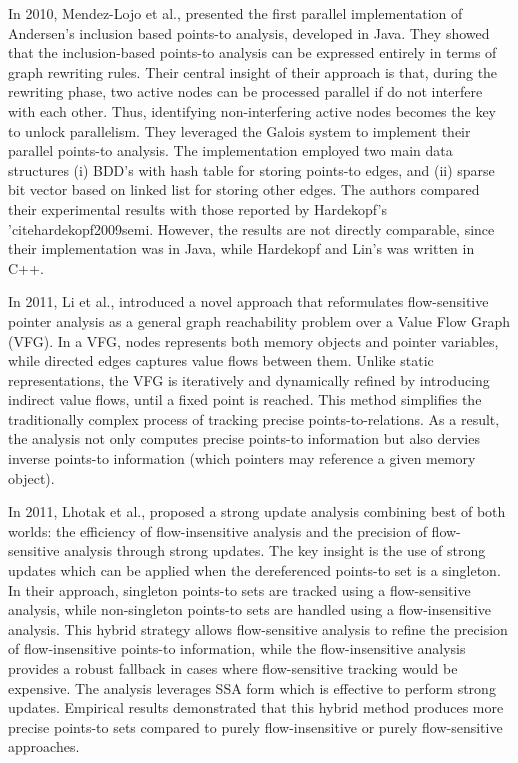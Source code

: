 In 2010, Mendez-Lojo et al., \cite{mendez2010parallel} presented the first parallel implementation of Andersen's inclusion based points-to analysis, developed in Java. 
They showed that the inclusion-based points-to analysis can be expressed entirely in terms of graph rewriting rules.
Their central insight of their approach is that, during the rewriting phase, two active nodes can be processed parallel if do not interfere with each other.
Thus, identifying non-interfering active nodes becomes the key to unlock parallelism.
They leveraged the Galois system \cite{galois} to implement their parallel points-to analysis.
The implementation employed two main data structures (i) BDD's with hash table for storing points-to edges, and (ii) sparse bit vector based on linked list for storing other edges. 
The authors compared their experimental results with those reported by Hardekopf's 'cite{hardekopf2009semi}.
However, the results are not directly comparable, since their implementation was in Java, while Hardekopf and Lin’s was written in C++.


In 2011, Li et al., \cite{li2011boosting} introduced a novel approach that reformulates flow-sensitive pointer analysis as a general graph reachability problem over a Value Flow Graph (VFG).
In a VFG, nodes represents both memory objects and pointer variables, while directed edges captures value flows between them.
Unlike static representations, the VFG is iteratively and dynamically refined by introducing indirect value flows, until a fixed point is reached.
This method simplifies the traditionally complex process of tracking precise points-to-relations.
As a result, the analysis not only computes precise points-to information but also dervies inverse points-to information (which pointers may reference a given memory object).

In 2011, Lhotak et al., \cite{lhotak2011points} proposed a strong update analysis combining best of both worlds: the efficiency of flow-insensitive analysis and the precision of flow-sensitive analysis through strong updates.
The key insight is the use of strong updates which can be applied when the dereferenced points-to set is a singleton. 
In their approach, singleton points-to sets are tracked using a flow-sensitive analysis, while non-singleton points-to sets are handled using a flow-insensitive analysis.
This hybrid strategy allows flow-sensitive analysis to refine the precision of flow-insensitive points-to information, while the flow-insensitive analysis provides a robust fallback in cases where flow-sensitive tracking would be expensive.
The analysis leverages SSA form which is effective to perform strong updates. Empirical results demonstrated that this hybrid method produces more precise points-to sets compared to purely flow-insensitive or purely flow-sensitive approaches.

